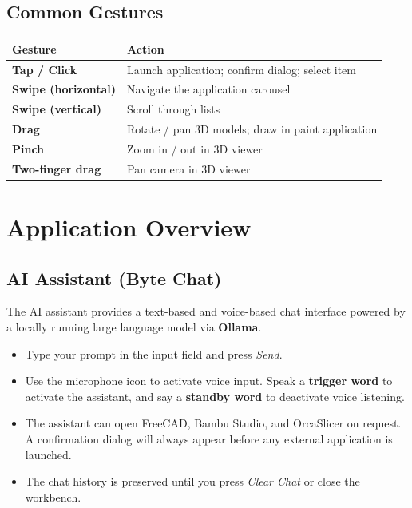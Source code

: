 \documentclass[a4paper,12pt]{article}
\begin{document}
\subsection{Common Gestures}
 
\begin{center}
\begin{tabular}{>{\bfseries}p{3.5cm} p{8.5cm}}
\toprule
Gesture & Action \\
\midrule
Tap / Click         & Launch application; confirm dialog; select item \\
Swipe (horizontal)  & Navigate the application carousel \\
Swipe (vertical)    & Scroll through lists \\
Drag                & Rotate / pan 3D models; draw in paint application \\
Pinch               & Zoom in / out in 3D viewer \\
Two-finger drag     & Pan camera in 3D viewer \\
\bottomrule
\end{tabular}
\end{center}

\newpage
\section{Application Overview}
 
\subsection{AI Assistant (Byte Chat)}
 
The AI assistant provides a text-based and voice-based chat interface powered by a locally running large language model via \textbf{Ollama}.
 
\begin{itemize}[leftmargin=1.5em]
    \item Type your prompt in the input field and press \textit{Send}.
    \item Use the microphone icon to activate voice input. Speak a \textbf{trigger word} to activate the assistant, and say a \textbf{standby word} to deactivate voice listening.
    \item The assistant can open FreeCAD, Bambu Studio, and OrcaSlicer on request. A confirmation dialog will always appear before any external application is launched.
    \item The chat history is preserved until you press \textit{Clear Chat} or close the workbench.
\end{itemize}
 
\end{document}
